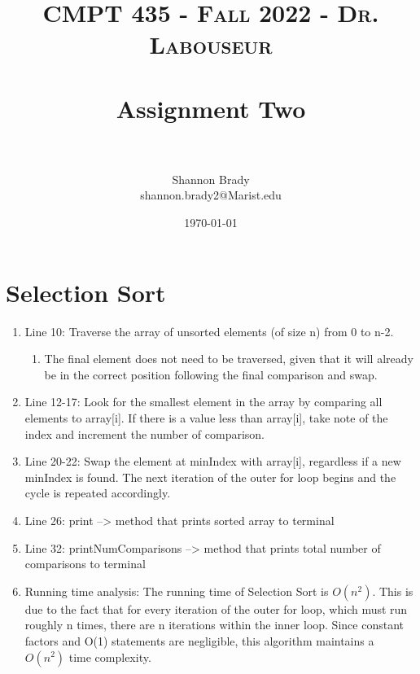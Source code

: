 \documentclass[letterpaper, 10pt,DIV=13]{scrartcl}
\title{	
   \normalfont \normalsize 
   \textsc{CMPT 435 - Fall 2022 - Dr. Labouseur} \\[10pt] %
   \horrule{0.5pt} \\[0.25cm] 	     %
   \huge Assignment Two  \\     	 %
   \horrule{0.5pt} \\[0.25cm] 	     %
}
\author{Shannon Brady \\ \normalsize shannon.brady2@Marist.edu}
\date{\normalsize\today} 	%
\numberwithin{equation}{section} %
\numberwithin{figure}{section} %
\numberwithin{table}{section} %
\begin{document}
\maketitle %

\section{Selection Sort}
\begin{enumerate}
    \item Line 10: Traverse the array of unsorted elements (of size n) from 0 to n-2. 
    \begin{enumerate}
        \item The final element does not need to be traversed, given that it will already be in the correct position following the final comparison and swap.
    \end{enumerate}
    \item Line 12-17: Look for the smallest element in the array by comparing all elements to array[i]. If there is a value less than array[i], take note of the index and increment the number of comparison.
    \item Line 20-22: Swap the element at minIndex with array[i], regardless if a new minIndex is found. The next iteration of the outer for loop begins and the cycle is repeated accordingly. 
    \item Line 26: print --> method that prints sorted array to terminal
    \item Line 32: printNumComparisons --> method that prints total number of comparisons to terminal
    \item Running time analysis: The running time of Selection Sort is $O(n^2)$. This is due to the fact that for every iteration of the outer for loop, which must run roughly n times, there are n iterations within the inner loop. Since constant factors and O(1) statements are negligible, this algorithm maintains a $O(n^2)$ time complexity.
\end{enumerate}
\end{document}
